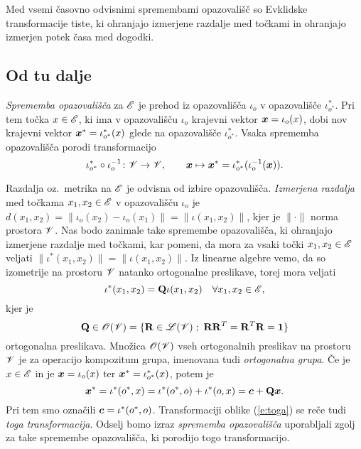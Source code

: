 Med vsemi časovno odvisnimi spremembami opazovališč so Evklidske transformacije
tiste, ki ohranjajo izmerjene razdalje med točkami in ohranjajo izmerjen
potek časa med dogodki.


\subsection{Od tu dalje}


\emph{Sprememba opazovališča} za $\mathscr E$ je prehod iz opazovališča $\iota_o$ v opazovališče
$\iota^*_{o^*}$. Pri tem točka $x\in\mathscr E$, ki ima v opazovališču $\iota_o$ krajevni vektor
$\boldsymbol x=\iota_o(x)$, dobi nov krajevni vektor $\boldsymbol x^*=\iota^*_{o^*}(x)$ glede na opazovališče
$\iota^*_{o^*}$. Vsaka sprememba opazovališča porodi transformacijo
\[
	\iota^*_{o^*}\circ\iota_o^{-1}\colon\mathscr V\to\mathscr V,\qquad
	\boldsymbol x\mapsto\boldsymbol x^*=\iota^*_{o^*}(\iota_o^{-1}(\boldsymbol x)).
\]

Razdalja oz.~metrika na $\mathscr E$ je odvisna od izbire opazovališča. \emph{Izmerjena razdalja} med točkama
$x_1,x_2\in\mathscr E$ v opazovališču $\iota_o$ je
$d(x_1,x_2)=\|\iota_o(x_2)-\iota_o(x_1)\|=\|\iota(x_1,x_2)\|$,
kjer je $\|\cdot\|$ norma prostora $\mathscr V$. Nas bodo zanimale take
spremembe opazovališča, ki ohranjajo izmerjene razdalje med točkami, kar pomeni,
da mora za vsaki točki $x_1,x_2\in\mathscr E$ veljati
$\|\iota^*(x_1,x_2)\|=\|\iota(x_1,x_2)\|$.
Iz linearne algebre vemo, da so izometrije na prostoru $\mathscr V$ natanko ortogonalne preslikave,
torej mora veljati
\begin{equation} \label{e:vektrans}
	\iota^*(x_1,x_2)=\mathbf Q\iota(x_1,x_2)\quad\forall x_1,x_2\in\mathscr E,
\end{equation}
kjer je
\[
	\ten{Q}\in\mathscr{O}(\V)=\{\ten{R}\in\L(\V)\;;\ \ten{R}\ten{R}^T=\ten{R}^T\ten{R}=\ten{1}\}
\]
ortogonalna preslikava. Množica $\mathscr{O}(\mathscr V)$ vseh ortogonalnih preslikav na prostoru
$\mathscr V$ je za operacijo kompozitum grupa, imenovana tudi \emph{ortogonalna grupa}. Če je $x\in\mathscr E$ in
je $\boldsymbol x=\iota_o(x)$ ter $\boldsymbol x^*=\iota^*_{o^*}(x)$, potem je
\begin{equation} \label{e:toga}
	\boldsymbol x^*=\iota^*(o^*,x)=\iota^*(o^*,o)+\iota^*(o,x)=\boldsymbol c+\mathbf Q\boldsymbol x.
\end{equation}
Pri tem smo označili $\boldsymbol c=\iota^*(o^*,o)$. Transformaciji oblike (\ref{e:toga})
se reče tudi \emph{toga transformacija}. Odselj bomo izraz \textit{sprememba opazovališča}
uporabljali zgolj za take spremembe opazovališča, ki porodijo togo transformacijo.

